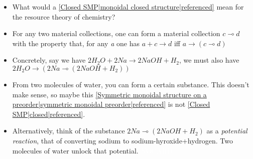 
\begin{itemize}
    \item What would a \ref{Closed SMP|monoidal closed structure|referenced} mean for the resource theory of chemistry?
    \item For any two material collections, one can form a material collection $c \multimap d$ with the property that, for any \emph{a} one has $a + c \rightarrow d$ iff $a \rightarrow (c \multimap d)$
    \item Concretely, say we have $2 H_2O + 2 Na \rightarrow 2 NaOH + H_2$, we must also have $2H_2O \rightarrow (2Na \multimap (2NaOH+H_2))$
    \item From two molecules of water, you can form a certain substance. This doesn't make sense, so maybe this \ref{Symmetric monoidal structure on a preorder|symmetric monoidal preorder|referenced} is not \ref{Closed SMP|closed|referenced}.
    \item Alternatively, think of the substance $2Na \multimap (2NaOH+H_2)$ as a \emph{potential reaction}, that of converting sodium to sodium-hyroxide+hydrogen. Two molecules of water unlock that potential. \textcolor{white}{NOCARD}
  \end{itemize}